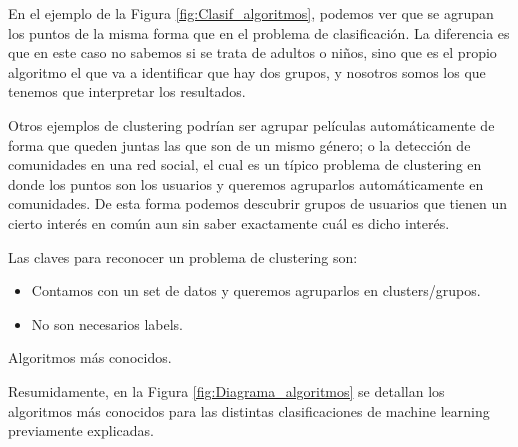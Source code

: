 \documentclass[12pt,a4paper]{article}
\makeatletter
\renewcommand\paragraph{\@startsection{paragraph}{4}{\z@}
            {-2.5ex\@plus -1ex \@minus -.25ex}
            {1.25ex \@plus .25ex}
            {\normalfont\normalsize\bfseries}}
\makeatother
\begin{document}
\begin{sloppypar}
En el ejemplo de la Figura \ref{fig:Clasif_algoritmos}, podemos ver que se agrupan los puntos de la misma forma que en el problema de clasificación. La diferencia es que en este caso no sabemos si se trata de adultos o niños, sino que es el propio algoritmo el que va a identificar que hay dos grupos, y nosotros somos los que tenemos que interpretar los resultados. 

Otros ejemplos de clustering podrían ser agrupar películas automáticamente de forma que queden juntas las que son de un mismo género; o la detección de comunidades en una red social, el cual es un típico problema de clustering en donde los puntos son los usuarios y queremos agruparlos automáticamente en comunidades. De esta forma podemos descubrir grupos de usuarios que tienen un cierto interés en común aun sin saber exactamente cuál es dicho interés.

Las claves para reconocer un problema de clustering\cite{apunte_uba} son:
\begin{itemize}
\item Contamos con un set de datos y queremos agruparlos en clusters/grupos.
\item No son necesarios labels.
\end{itemize}

\cleardoublepage

\paragraph{Algoritmos más conocidos.}

Resumidamente, en la Figura \ref{fig:Diagrama_algoritmos} se detallan los algoritmos más conocidos para las distintas clasificaciones de machine learning previamente explicadas. 


\end{sloppypar}
\end{document}
